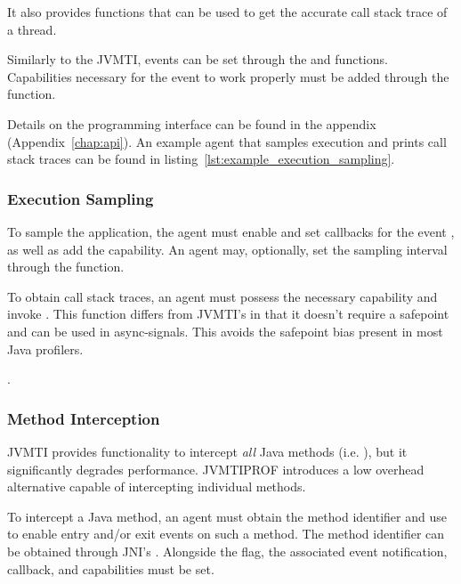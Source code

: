 It also provides functions that can be used to get the accurate call stack trace of a thread.

Similarly to the JVMTI, events can be set through the  and  functions. Capabilities necessary for the event to work properly must be added through the  function.

Details on the programming interface can be found in the appendix (Appendix~\ref{chap:api}). An example agent that samples execution and prints call stack traces can be found in listing~\ref{lst:example_execution_sampling}.

\subsubsection*{Execution Sampling}

To sample the application, the agent must enable and set callbacks for the event , as well as add the  capability. An agent may, optionally, set the sampling interval through the  function.


To obtain call stack traces, an agent must possess the necessary capability and invoke . This function differs from JVMTI's  in that it doesn't require a safepoint and can be used in async-signals. This avoids the safepoint bias present in most Java profilers.


.

\subsubsection*{Method Interception}

JVMTI provides functionality to intercept \emph{all} Java methods (i.e. ), but it significantly degrades performance. JVMTIPROF introduces a low overhead alternative capable of intercepting individual methods.

To intercept a Java method, an agent must obtain the method identifier and use  to enable entry and/or exit events on such a method. The method identifier can be obtained through JNI's . Alongside the flag, the associated event notification, callback, and capabilities must be set.


